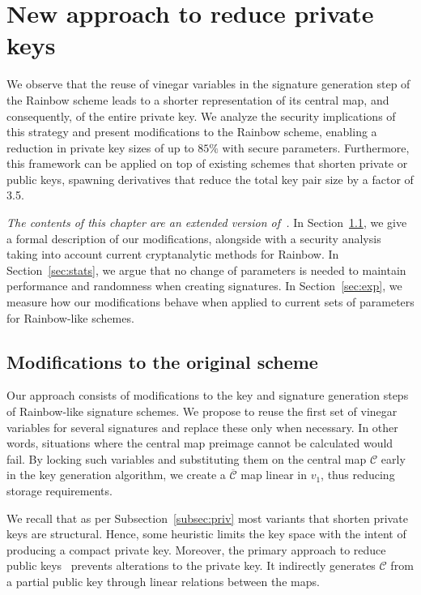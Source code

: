 \documentclass[english]{ufsc-thesis-rn46-2019/ufsc-thesis-rn46-2019}
\theoremstyle{definition}
\begin{document}
\chapter{New approach to reduce private keys}\label{ch:eta}

We observe that the reuse of vinegar variables in the signature generation step
of the Rainbow scheme leads to a shorter representation of its central map, and
consequently, of the entire private key. We analyze the security implications
of this strategy and present modifications to the Rainbow scheme, enabling
a reduction in private key sizes of up to $85\%$ with secure
parameters. Furthermore, this framework can be applied on top of existing
schemes that shorten private or public keys, spawning derivatives that reduce
the total key pair size by a factor of 3.5.

\emph{The contents of this chapter are an extended version
of~\cite{Zambonin:201907}.} In Section~\ref{sec:mod}, we give a formal
description of our modifications, alongside with a security analysis taking
into account current cryptanalytic methods for Rainbow. In
Section~\ref{sec:stats}, we argue that no change of parameters is needed to
maintain performance and randomness when creating signatures. In
Section~\ref{sec:exp}, we measure how our modifications behave when applied to
current sets of parameters for Rainbow-like schemes.

\section{Modifications to the original scheme}\label{sec:mod}

Our approach consists of modifications to the key and signature generation
steps of Rainbow-like signature schemes. We propose to reuse the first set of
vinegar variables for several signatures and replace these only when
necessary. In other words, situations where the central map preimage cannot be
calculated would fail. By locking such variables and substituting them on the
central map $\mathcal{C}$ early in the key generation algorithm, we create
a $\overline{\mathcal{C}}$ map linear in $v_{1}$, thus reducing storage
requirements.

We recall that as per Subsection~\ref{subsec:priv} most variants that shorten
private keys are structural. Hence, some heuristic limits the key space with
the intent of producing a compact private key. Moreover, the primary approach
to reduce public keys~\cite{Petzoldt:201307} prevents alterations to the
private key. It indirectly generates $\mathcal{C}$ from a partial public key
through linear relations between the maps.
\end{document}
